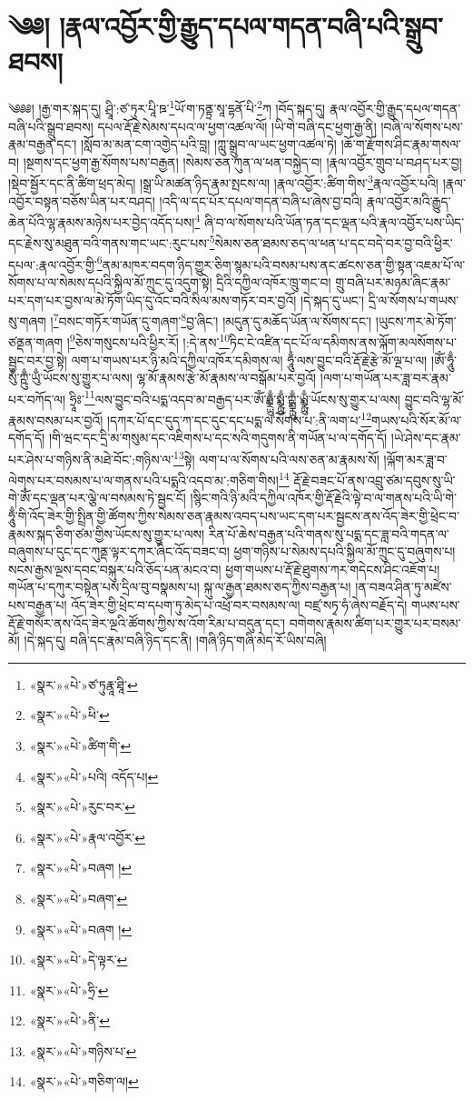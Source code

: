 \chapter{༄༅། །རྣལ་འབྱོར་གྱི་རྒྱུད་དཔལ་གདན་བཞི་པའི་སྒྲུབ་ཐབས།}༄༅༅། །རྒྱ་གར་སྐད་དུ། ཤྲཱི་:ཙ་ཏུར་པཱི་ཋ་\footnote{«སྣར་»«པེ་»ཙ་ཏུརྣཱ་ཐཱི་}ཡོ་ག་ཏནྟྲ་སཱ་དྷནོ་པི་\footnote{«སྣར་»«པེ་»ཕི་}ཀ །བོད་སྐད་དུ། རྣལ་འབྱོར་གྱི་རྒྱུད་དཔལ་གདན་བཞི་པའི་སྒྲུབ་ཐབས། དཔལ་རྡོ་རྗེ་སེམས་དཔའ་ལ་ཕྱག་འཚལ་ལོ། །ཡི་གེ་བཞི་དང་ཕྱག་རྒྱ་ནི། །བཞི་ལ་སོགས་པས་རྣམ་བརྒྱན་དང་། །སློབ་མ་མན་ངག་འགྱེད་པའི་བླ། །ཀླུ་སྒྲུབ་ལ་ཡང་ཕྱག་འཚལ་ཏེ། །ཆོ་ག་རྫོགས་ཤིང་རྣམ་གསལ་བ། །སྔགས་དང་ཕྱག་རྒྱ་སོགས་པས་བརྒྱན། །སེམས་ཅན་ཀུན་ལ་ཕན་བསྐྱེད་བ། །རྣལ་འབྱོར་གྲུབ་པ་བཤད་པར་བྱ། །སྡེབ་སྦྱོར་དང་ནི་ཚིག་ཕྲད་མེད། །སྒྲ་ཡི་མཚན་ཉིད་རྣམ་སྤངས་ལ། །རྣལ་འབྱོར་:ཚིག་གིས་\footnote{«སྣར་»«པེ་»ཚིག་གི་}རྣལ་འབྱོར་པའི། །རྣལ་འབྱོར་བསྟན་བཅོས་ཡིན་པར་བཤད། །འདི་ལ་དང་པོར་དཔལ་གདན་བཞི་པ་ཞེས་བྱ་བའི། རྣལ་འབྱོར་མའི་རྒྱུད་ཆེན་པོའི་ལྷ་རྣམས་མཉེས་པར་བྱེད་འདོད་པས།\footnote{«སྣར་»«པེ་»པའི། འདོད་པ།} ཞི་བ་ལ་སོགས་པའི་ཡོན་ཏན་དང་ལྡན་པའི་རྣལ་འབྱོར་པས་ཡིད་དང་རྗེས་སུ་མཐུན་བའི་གནས་གང་ཡང་:རུང་པས་\footnote{«སྣར་»«པེ་»རུང་བར་}སེམས་ཅན་ཐམས་ཅད་ལ་ཕན་པ་དང་བདེ་བར་བྱ་བའི་ཕྱིར་དཔལ་:རྣལ་འབྱོར་གྱི་\footnote{«སྣར་»«པེ་»རྣལ་འབྱོར་}ནམ་མཁར་བདག་ཉིད་གྱུར་ཅིག་སྙམ་པའི་བསམ་པས་ནང་ཚངས་ཅན་གྱི་སྟན་འཇམ་པོ་ལ་སོགས་པ་ལ་སེམས་དཔའི་སྐྱིལ་མོ་ཀྲུང་དུ་འདུག་སྟེ། དྲིའི་དཀྱིལ་འཁོར་ཁྲུ་གང་བ། གྲུ་བཞི་པར་མཉམ་ཞིང་རྣམ་པར་དག་པར་བྱས་ལ་མེ་ཏོག་ཡིད་དུ་འོང་བའི་སིལ་མས་གཏོར་བར་བྱའོ། །དེ་སྐད་དུ་ཡང་། དྲི་ལ་སོགས་པ་གཡས་སུ་གཞག །\footnote{«སྣར་»«པེ་»བཞག །}བསང་གཏོར་གཡོན་དུ་གཞག་\footnote{«སྣར་»«པེ་»བཞག་}བྱ་ཞིང་། །མདུན་དུ་མཆོད་ཡོན་ལ་སོགས་དང་། །ཡུངས་ཀར་མེ་ཏོག་ཙནྡན་གཞག །\footnote{«སྣར་»«པེ་»བཞག །}ཅེས་གསུངས་པའི་ཕྱིར་རོ། །:དེ་ནས་\footnote{«སྣར་»«པེ་»དེ་ལྟར་}ཏིང་ངེ་འཛིན་དང་པོ་ལ་དམིགས་ནས་ལྐོག་མལསོགས་པ་སྦྱང་བར་བྱ་སྟེ། ལག་པ་གཡས་པར་ཉི་མའི་དཀྱིལ་འཁོར་དམིགས་ལ། ཧཱུྃ་ལས་བྱུང་བའི་རྡོ་རྗེ་རྩེ་མོ་ལྔ་པ་ལ། །ཨོཾ་ཧཱུྃ་སུྃ་ཀྵུྃ་ཡུྃ་ཡོངས་སུ་གྱུར་པ་ལས། ལྷ་མོ་རྣམས་རྩེ་མོ་རྣམས་ལ་བསྒོམ་པར་བྱའོ། །ལག་པ་གཡོན་པར་ཟླ་བར་རྣམ་པར་བཀོད་ལ། ཧྲཱིཿ་\footnote{«སྣར་»«པེ་»ཧྲི་}ལས་བྱུང་བའི་པདྨ་འདབ་མ་བརྒྱད་པར་ཨོཾ་ཧྨྼྻུྃ་སྨྼྻུྃ་ཀྵྨྼྻུྃ་ཡྨྼྻུྃ་ཡོངས་སུ་གྱུར་པ་ལས། བྱུང་བའི་ལྷ་མོ་རྣམས་བསམ་པར་བྱའོ། །དཀར་པོ་དང་དུད་ཀ་དང་དུང་དང་པདྨ་ལ་སོགས་པ་:ནི་ལག་པ་\footnote{«སྣར་»«པེ་»ནི་}གཡས་པའི་སོར་མོ་ལ་དགོད་དོ། །གི་ཝང་དང་དྲི་མ་གསུམ་དང་འཇིགས་པ་དང་སའི་གདུགས་ནི་གཡོན་པ་ལ་དགོད་དོ། །ཡེ་ཤེས་དང་རྣམ་པར་ཤེས་པ་གཉིས་ནི་མཐེ་བོང་:གཉིས་ལ་\footnote{«སྣར་»«པེ་»གཉིས་པ་}སྟེ། ལག་པ་ལ་སོགས་པའི་ལས་ཅན་མ་རྣམས་སོ། །ལྐོག་མར་ཟླ་བ་ལེགས་པར་བསམས་པ་ལ་གནས་པའི་པདྨའི་འདབ་མ་:གཅིག་གིས།\footnote{«སྣར་»«པེ་»གཅིག་ལ།} རྡོ་རྗེ་བཟང་པོ་ནས་འབྲུ་ཙམ་དབུས་སུ་ཡི་གེ་ཨོཾ་དང་ལྡན་པར་ལྕེ་ལ་བསམས་ཏེ་སྦྱང་ངོ། །སྙིང་གའི་ཉི་མའི་དཀྱིལ་འཁོར་གྱི་རྡོ་རྗེའི་ལྟེ་བ་ལ་གནས་པའི་ཡི་གེ་ཧཱུྃ་གི་འོད་ཟེར་གྱི་སྤྲིན་གྱི་ཚོགས་ཀྱིས་སེམས་ཅན་རྣམས་འབད་པས་ཡང་དག་པར་སྦྱངས་ནས་འོད་ཟེར་གྱི་ཕྲེང་བ་རྣམས་སྐད་ཅིག་ཙམ་གྱིས་ཡོངས་སུ་གྱུར་པ་ལས། རིན་པོ་ཆེས་བརྒྱན་པའི་གནས་སུ་པདྨ་དང་ཟླ་བའི་གདན་ལ་བཞུགས་པ་དུང་དང་ཀུནྡ་ལྟར་དཀར་ཞིང་འོད་བཟང་བ། ཕྱག་གཉིས་པ་སེམས་དཔའི་སྐྱིལ་མོ་ཀྲུང་དུ་བཞུགས་པ། སངས་རྒྱས་ལྔས་དབང་བསྐུར་པའི་ཅོད་པན་མངའ་བ། ཕྱག་གཡས་པ་རྡོ་རྗེ་ཐུགས་ཀར་གདེངས་ཤིང་འཇོག་པ། གཡོན་པ་དཀུར་བསྟེན་པས་དྲིལ་བུ་བསྣམས་པ། སྐུ་ལ་རྒྱན་ཐམས་ཅད་ཀྱིས་བརྒྱན་པ། །ན་བཟའ་ཤིན་ཏུ་མཛེས་པས་བརྒྱན་པ། འོད་ཟེར་གྱི་ཕྲེང་བ་དཔག་ཏུ་མེད་པ་འཕྲོ་བར་བསམས་ལ། བཛྲ་སཏྭ་ཧཾ་ཞེས་བརྗོད་དེ། གཡས་པས་རྡོ་རྗེ་གསོར་ནས་འོད་ཟེར་ལྔའི་ཚོགས་ཀྱིས་ས་འོག་རིམ་པ་བདུན་དང་། བགེགས་རྣམས་ཚིག་པར་གྱུར་པར་བསམ་མོ། །དེ་སྐད་དུ། བཞི་དང་རྣམ་བཞི་ཉིད་དང་ནི། །གཞི་ཉིད་གཞི་མེད་རོ་ཡིས་བཞི། 
